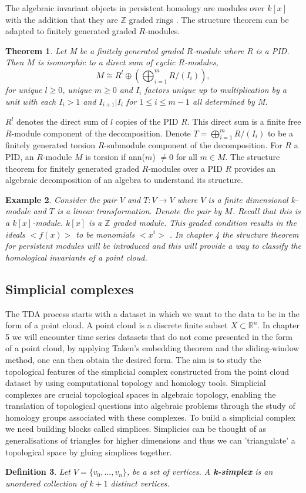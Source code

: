 \documentclass{article}
\newcommand{\be}{\begin{equation}}
\newcommand{\ee}{\end{equation}}
\newtheorem{theorem}{Theorem}[section]
\newtheorem{definition}[theorem]{Definition}
\newtheorem{example}[theorem]{Example}
\begin{document}
The algebraic invariant objects in persistent homology are modules over $k[x]$ with the addition that they are $\mathbb{Z}$ graded rings \cite{HSchenckAlgebraicFound}.
The structure theorem can be adapted to finitely generated graded $R$-modules.
\begin{theorem}Let M be a finitely generated graded $R$-module where R is a PID. Then $M$ is isomorphic to a direct sum of cyclic $R$-modules,
\be
M \cong R^{l} \oplus (\bigoplus^{m}_{i=1} R/(I_i)),
\ee
for unique $l\geq 0$, unique $m\geq 0$ and  $I_i$ factors unique up to multiplication by a unit with each $I_i > 1$ and $I_{i+1}|I_i$ for $1\leq i \leq m-1$ all determined by M.
\end{theorem}
$R^{l}$ denotes the direct sum of $l$ copies of the PID $R$. This direct sum is a finite free $R$-module component of the decomposition. Denote $T = \bigoplus^{m}_{i=1} R/(I_i) $ to be a finitely generated torsion $R$-submodule component of the decomposition. 
For $R$ a PID, an $R$-module $M$ is torsion if ann($m$) $\neq 0$ for all $m \in M$. 
The structure theorem for finitely generated graded $R$-modules over a PID $R$ provides an algebraic decomposition of an algebra to understand its structure.
\begin{example} Consider the pair $V$ and $T: V \to V$ where $V$ is a finite dimensional $k$-module and $T$ is a linear transformation. Denote the pair by $M$. Recall that this is a $k[x]$-module. $k[x]$ is a $\mathbb{Z}$ graded module. This graded condition results in the ideals $<f(x)>$ to be monomials $<x^{i}>$ \cite{HSchenckAlgebraicFound}. In chapter 4 the structure theorem for persistent modules will be introduced and this will provide a way to classify the homological invariants of a point cloud.
\end{example}
\subsection{Simplicial complexes} \label{Simplicial Complexes}
The TDA process starts with a dataset in which we want to the data to be in the form of a point cloud. A point cloud is a discrete finite subset $X \subset \mathbb{R}^n$. In chapter 5 we will encounter time series datasets that do not come presented in the form of a point cloud, by applying Taken's embedding theorem and the sliding-window method, one can then obtain the desired form. The aim is to study the topological features of the simplicial complex constructed from the point cloud dataset by using computational topology and homology tools. Simplicial complexes are crucial topological spaces in algebraic topology, enabling the translation of topological questions into algebraic problems through the study of homology groups associated with these complexes. 
To build a simplicial complex we need building blocks called simplices. Simplicies can be thought of as generalisations of triangles for higher dimensions and thus we can 'triangulate' a topological space by gluing simplices together. \hfill\break
\begin{definition} Let $V = \{v_0,...,v_n\}$, be a set of vertices. A \textbf{k-simplex} is an unordered collection of $k+1$ distinct vertices.
\end{definition}
\end{document}
